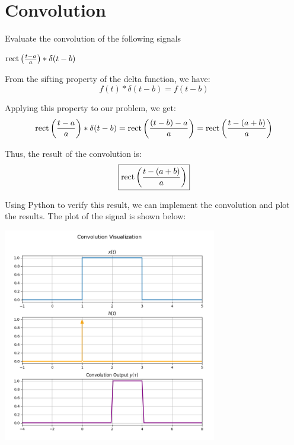 \documentclass[a4paper, 10pt]{article}
\begin{document}
\subject[2110203 - Computer Engineering Mathematics II]


\section{Convolution}



\begin{problem}
Evaluate the convolution of the following signals
\end{problem}

\begin{subproblems}[start=1]
    \item \( \textrm{rect} \left( \frac{t-a}{a} \right) * \delta (t-b) \)
\end{subproblems}

\begin{solution}
From the sifting property of the delta function, we have:
\[ f(t) * \delta(t - b) = f(t - b) \]

Applying this property to our problem, we get:
\[ \textrm{rect} \left( \frac{t - a}{a} \right) * \delta(t - b) = \textrm{rect} \left( \frac{(t - b) - a}{a} \right) = \textrm{rect} \left( \frac{t - (a + b)}{a} \right) \]

Thus, the result of the convolution is:
\[ \boxed{ \textrm{rect} \left( \frac{t - (a + b)}{a} \right) } \]

Using Python to verify this result, we can implement the convolution and plot the results.
The plot of the signal is shown below:
\begin{center}
    \includegraphics[width=0.7\textwidth]{images/problem_1_1_snapshot.png}
\end{center}
\end{solution}
\end{document}
